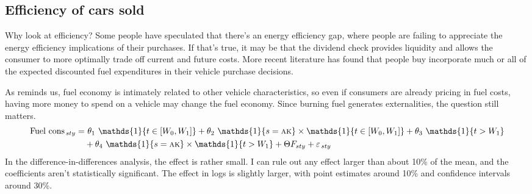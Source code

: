 \documentclass[11pt,letterpaper,oneside]{article}
\let\originalleft\left
\let\originalright\right
\renewcommand{\left}{\mathopen{}\mathclose\bgroup\originalleft}
\renewcommand{\right}{\aftergroup\egroup\originalright}
\newcommand{\indicator}[1]{\mathds{1}\left\{#1\right\}}
\newcommand{\anticipation}{\indicator{t \in [W_0, W_1]}}
\newcommand{\isAlaska}{\indicator{s = \textsc{ak}}}
\newcommand{\postWindow}{\indicator{t > W_1}}
\newcommand{\ddEqn}[3]{%
\text{#1}_{\, sty} = & \  #2_1 \ \anticipation + #2_2 \ \isAlaska \times \anticipation + #2_3 \ \postWindow \\ \nonumber
&+ #2_4 \ \isAlaska \times \postWindow + #3 F_{ sty} + \varepsilon_{\, sty}
}
\newcommand{\ddEqnLog}[3]{%
\ln\left(\text{#1}_{\, sty}\right) = & \  #2_1 \ \anticipation + #2_2 \ \isAlaska \times \anticipation + #2_3 \ \postWindow \\ \nonumber
&+ #2_4 \ \isAlaska \times \postWindow + #3 F_{ sty} + \varepsilon_{\, sty}
}
\begin{document}
\begin{doublespacing}
\subsection{Efficiency of cars sold}

Why look at efficiency?
Some people have speculated that there's an energy efficiency gap, where people are failing to appreciate the energy efficiency implications of their purchases.
If that's true, it may be that the dividend check provides liquidity and allows the consumer to more optimally trade off current and future costs.
More recent literature has found that people buy incorporate much \parencite{allcott2014gasoline} or all \parencite{busse2013consumers, grigolon2014consumer, sallee2016consumers} of the expected discounted fuel expenditures in their vehicle purchase decisions.

As \textcite{kiso2013automobilefueleconomy} reminds us, fuel economy is intimately related to other vehicle characteristics, so even if consumers are already pricing in fuel costs, having more money to spend on a vehicle may change the fuel economy.
Since burning fuel generates externalities, the question still matters. %
\begin{align}
    \label{eqn:fuel-cons}
    \ddEqn{Fuel cons}{\theta}{\Theta}%
\end{align}
In the difference\hyp{}in\hyp{}differences analysis, the effect is rather small.
I can rule out any effect larger than about 10\% of the mean, and the coefficients aren't statistically significant.
The effect in logs is slightly larger, with point estimates around 10\% and confidence intervals around 30\%.




\end{doublespacing}
\end{document}
